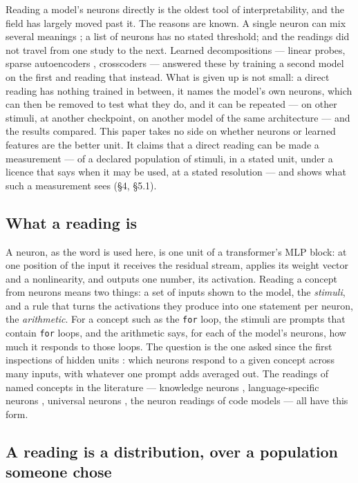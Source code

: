 \documentclass{article}
\begin{document}
Reading a model's neurons directly is the oldest tool of interpretability, and the field has largely moved past it. The reasons are known. A single neuron can mix several meanings \citep{elhage2022}; a list of neurons has no stated threshold; and the readings did not travel from one study to the next. Learned decompositions --- linear probes, sparse autoencoders \citep{bricken2023,cunningham2023}, crosscoders \citep{lindsey2024} --- answered these by training a second model on the first and reading that instead. What is given up is not small: a direct reading has nothing trained in between, it names the model's own neurons, which can then be removed to test what they do, and it can be repeated --- on other stimuli, at another checkpoint, on another model of the same architecture --- and the results compared. This paper takes no side on whether neurons or learned features are the better unit. It claims that a direct reading can be made a measurement --- of a declared population of stimuli, in a stated unit, under a licence that says when it may be used, at a stated resolution --- and shows what such a measurement sees (\S4, \S5.1).

\subsection{What a reading is}

A neuron, as the word is used here, is one unit of a transformer's MLP block: at one position of the input it receives the residual stream, applies its weight vector and a nonlinearity, and outputs one number, its activation. Reading a concept from neurons means two things: a set of inputs shown to the model, the \emph{stimuli}, and a rule that turns the activations they produce into one statement per neuron, the \emph{arithmetic}. For a concept such as the \texttt{for} loop, the stimuli are prompts that contain \texttt{for} loops, and the arithmetic says, for each of the model's neurons, how much it responds to those loops. The question is the one asked since the first inspections of hidden units \citep{karpathy2016,bau2017}: which neurons respond to a given concept across many inputs, with whatever one prompt adds averaged out. The readings of named concepts in the literature --- knowledge neurons \citep{dai2022}, language-specific neurons \citep{tang2024}, universal neurons \citep{gurnee2024}, the neuron readings of code models \citep{sharma2023,kargaran2025,yin2025} --- all have this form.

\subsection{A reading is a distribution, over a population someone chose}
\end{document}

